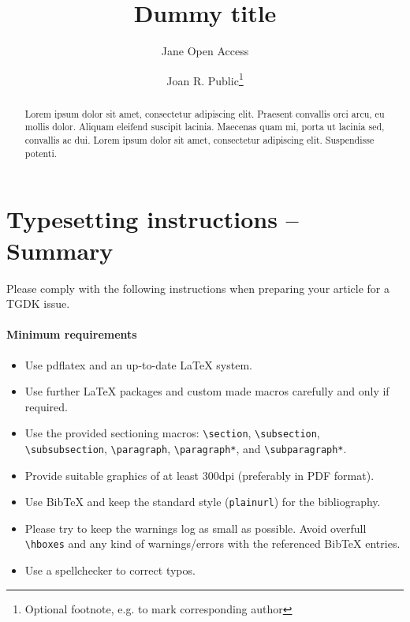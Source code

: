 \documentclass[a4paper,UKenglish,cleveref,autoref, thm-restate]{tgdk-v2021}
\title{Dummy title} %
\author{Jane {Open Access}}{Dummy University Computing Laboratory, [optional: Address], Country \and My second affiliation, Country \and \url{http://www.myhomepage.edu} }{johnqpublic@dummyuni.org}{https://orcid.org/0000-0002-1825-0097}{(Optional) author-specific funding acknowledgements}%
\author{Joan R. Public\footnote{Optional footnote, e.g. to mark corresponding author}}{Department of Informatics, Dummy College, [optional: Address], Country}{joanrpublic@dummycollege.org}{[orcid]}{[funding]}
\begin{document}
\maketitle

\begin{abstract}
Lorem ipsum dolor sit amet, consectetur adipiscing elit. Praesent convallis orci arcu, eu mollis dolor. Aliquam eleifend suscipit lacinia. Maecenas quam mi, porta ut lacinia sed, convallis ac dui. Lorem ipsum dolor sit amet, consectetur adipiscing elit. Suspendisse potenti. 
\end{abstract}

\section{Typesetting instructions -- Summary}
\label{sec:typesetting-summary}

Please comply with the following instructions when preparing your article for a TGDK issue. 
\paragraph*{Minimum requirements}

\begin{itemize}
\item Use pdflatex and an up-to-date \LaTeX{} system.
\item Use further \LaTeX{} packages and custom made macros carefully and only if required.
\item Use the provided sectioning macros: \verb+\section+, \verb+\subsection+, \verb+\subsubsection+, \linebreak \verb+\paragraph+, \verb+\paragraph*+, and \verb+\subparagraph*+.
\item Provide suitable graphics of at least 300dpi (preferably in PDF format).
\item Use BibTeX and keep the standard style (\verb+plainurl+) for the bibliography.
\item Please try to keep the warnings log as small as possible. Avoid overfull \verb+\hboxes+ and any kind of warnings/errors with the referenced BibTeX entries.
\item Use a spellchecker to correct typos.
\end{itemize}
\end{document}
